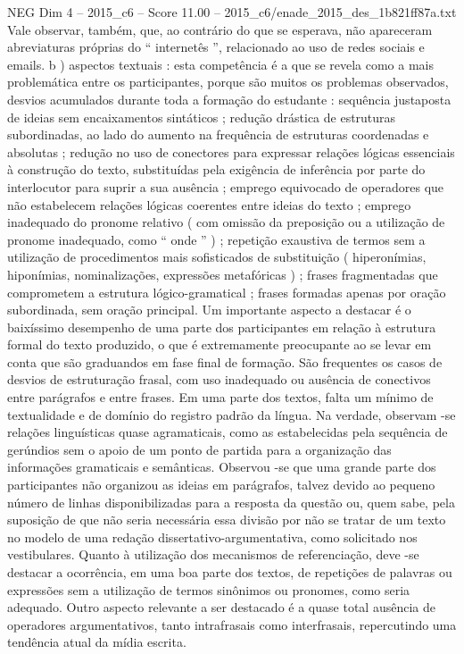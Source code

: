\begin{textsample}{NEG Dim 4 – 2015\_c6 – Score 11.00 – 2015\_c6/enade\_2015\_des\_1b821ff87a.txt}
Vale observar, também, que, ao contrário do que se esperava, não apareceram abreviaturas próprias do “ internetês ”, relacionado ao uso de redes sociais e emails. b ) aspectos textuais : esta competência é a que se revela como a mais problemática entre os participantes, porque são muitos os problemas observados, desvios acumulados durante toda a formação do estudante : sequência justaposta de ideias sem encaixamentos sintáticos ; redução drástica de estruturas subordinadas, ao lado do aumento na frequência de estruturas coordenadas e absolutas ; redução no uso de conectores para expressar relações lógicas essenciais à construção do texto, substituídas pela exigência de inferência por parte do interlocutor para suprir a sua ausência ; emprego equivocado de operadores que não estabelecem relações lógicas coerentes entre ideias do texto ; emprego inadequado do pronome relativo ( com omissão da preposição ou a utilização de pronome inadequado, como “ onde ” ) ; repetição exaustiva de termos sem a utilização de procedimentos mais sofisticados de substituição ( hiperonímias, hiponímias, nominalizações, expressões metafóricas ) ; frases fragmentadas que comprometem a estrutura lógico-gramatical ; frases formadas apenas por oração subordinada, sem oração principal.
Um importante aspecto a destacar é o baixíssimo desempenho de uma parte dos participantes em relação à estrutura formal do texto produzido, o que é extremamente preocupante ao se levar em conta que são graduandos em fase final de formação.
São frequentes os casos de desvios de estruturação frasal, com uso inadequado ou ausência de conectivos entre parágrafos e entre frases.
Em uma parte dos textos, falta um mínimo de textualidade e de domínio do registro padrão da língua.
Na verdade, observam -se relações linguísticas quase agramaticais, como as estabelecidas pela sequência de gerúndios sem o apoio de um ponto de partida para a organização das informações gramaticais e semânticas.
Observou -se que uma grande parte dos participantes não organizou as ideias em parágrafos, talvez devido ao pequeno número de linhas disponibilizadas para a resposta da questão ou, quem sabe, pela suposição de que não seria necessária essa divisão por não se tratar de um texto no modelo de uma redação dissertativo-argumentativa, como solicitado nos vestibulares.
Quanto à utilização dos mecanismos de referenciação, deve -se destacar a ocorrência, em uma boa parte dos textos, de repetições de palavras ou expressões sem a utilização de termos sinônimos ou pronomes, como seria adequado.
Outro aspecto relevante a ser destacado é a quase total ausência de operadores argumentativos, tanto intrafrasais como interfrasais, repercutindo uma tendência atual da mídia escrita.

\end{textsample}
